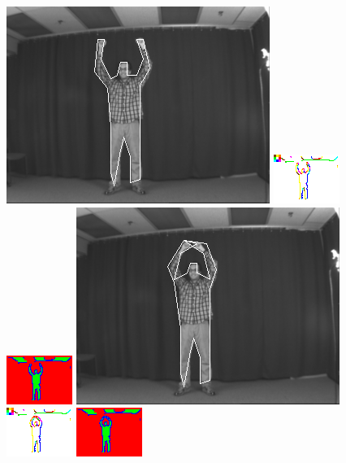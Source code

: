 \documentclass{tufte-book}
\begin{document}
\begin{figure}
\includegraphics[width=0.3 \linewidth]{output/2.detection/image_parsing/out.8.d/thefinalparse.png}
\includegraphics[width=0.3 \linewidth]{output/2.detection/image_parsing/out.8.d/local.x5.orientations.png}
\includegraphics[width=0.3 \linewidth]{output/2.detection/image_parsing/out.8.d/local.x5.interior.png}
\includegraphics[width=0.3 \linewidth]{output/2.detection/image_parsing/out.9.d/thefinalparse.png}
\includegraphics[width=0.3 \linewidth]{output/2.detection/image_parsing/out.9.d/local.x5.orientations.png}
\includegraphics[width=0.3 \linewidth]{output/2.detection/image_parsing/out.9.d/local.x5.interior.png}

\end{figure}
\end{document}
